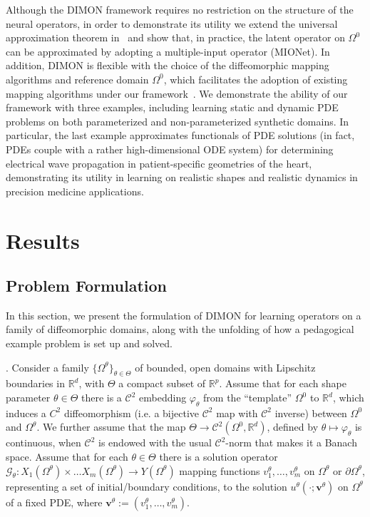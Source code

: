 \documentclass[review]{elsarticle}
\def\Omegatheta{{\Omega^\theta}}
\def\refd{0}
\def\Omegaref{{\Omega^\refd}}
\def\bfvtheta{\mathbf{v}^\theta}
\begin{document}
Although the DIMON framework requires no restriction on the structure of the neural operators, in order to demonstrate its utility we extend the universal approximation theorem in~\cite{jin2022mionet} and show that, in practice, the latent operator on $\Omegaref$ can be approximated by adopting a multiple-input operator (MIONet). In addition, DIMON is flexible with the choice of the diffeomorphic mapping algorithms and reference domain $\Omegaref$, which facilitates the adoption of existing mapping algorithms under our framework~\cite{ovsjanikov2012functional,vercauteren2009diffeomorphic}. We demonstrate the ability of our framework with three examples, including learning static and dynamic PDE problems on both parameterized and non-parameterized synthetic domains. In particular, the last example approximates functionals of PDE solutions (in fact, PDEs couple with a rather high-dimensional ODE system) for determining electrical wave propagation in patient-specific geometries of the heart, demonstrating its utility in learning on realistic shapes and realistic dynamics in precision medicine applications.


\section{Results}
\label{sec:res}

\subsection{Problem Formulation}
\label{subsec:prob_formul} 
In this section, we present the formulation of DIMON for learning operators on a family of diffeomorphic domains, along with the unfolding of how a pedagogical example problem is set up and solved. 

. Consider a family $\{\Omegatheta\}_{\theta\in\Theta}$ of bounded, open domains with Lipschitz boundaries in $\mathbb{R}^{d}$, with $\Theta$ a compact subset of $\mathbb{R}^p$. Assume that for each shape parameter $\theta\in\Theta$ there is a $\mathcal{C}^2$ embedding $\varphi_\theta$ from the ``template'' $\Omegaref$ to $\mathbb{R}^{d}$, which induces a $C^2$ diffeomorphism (i.e. a bijective $\mathcal{C}^2$ map with $\mathcal{C}^2$ inverse) between $\Omegaref$ and $\Omegatheta$. We further assume that the map $\Theta\rightarrow \mathcal{C}^2(\Omegaref,\mathbb{R}^{d})$, defined by $\theta\mapsto\varphi_\theta$ is continuous, when $\mathcal{C}^2$ is endowed with the usual $\mathcal{C}^2$-norm that makes it a Banach space.
Assume that for each $\theta \in \Theta$ there is a solution operator $\mathcal{G}_{\theta}:X_1(\Omegatheta)\times\dots X_m(\Omegatheta)\rightarrow Y(\Omegatheta)$ mapping functions $v^{\theta}_{1},\dots,v^\theta_m$ on $\Omegatheta$ or $\partial\Omegatheta$, representing a set of initial/boundary conditions, to the solution $u^{\theta}(\cdot;\bfvtheta)$ on $\Omegatheta$ of a fixed PDE, where $\bfvtheta:=(v^\theta_1,\dots,v^\theta_m)$. 
\end{document}
